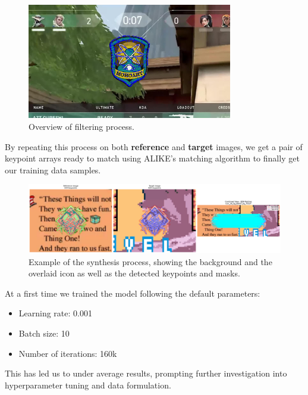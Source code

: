 \begin{figure}[H]
    \centering
    \includegraphics[width=0.8\textwidth]{ressources/image1_keypoints_masked.jpg}
    \caption{Overview of filtering process.}
    \label{fig:teacher_student}
\end{figure}
By repeating this process on both \textbf{reference} and \textbf{target} images, we get a pair of keypoint arrays ready to match using ALIKE's matching algorithm to finally get our training data samples.

\begin{figure}[H]
    \centering
    \includegraphics[width=\textwidth]{ressources/example_data1.png}
    \caption{Example of the synthesis process, showing the background and the overlaid icon as well as the detected keypoints and masks.}
    \label{fig:synthesis_example1}
\end{figure}
At a first time we trained the model following the default parameters:
\begin{itemize}
    \item Learning rate: 0.001
    \item Batch size: 10
    \item Number of iterations: 160k
\end{itemize}
This has led us to under average results, prompting further investigation into hyperparameter tuning and data formulation.

